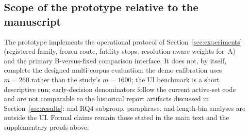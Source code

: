 \documentclass[pdflatex,sn-mathphys-num]{sn-jnl}
\begin{document}
\begin{appendices}
\subsection{Scope of the prototype relative to the manuscript}

The prototype implements the operational protocol of Section~\ref{sec:experiments} (registered family, frozen route, futility stops, resolution-aware weights for~A) and the primary B-versus-fixed comparison interface. It does not, by itself, complete the designed multi-corpus evaluation: the demo calibration uses \(m=260\) rather than the study's \(m=1600\); the UI benchmark is a short descriptive run; early-decision denominators follow the current active-set code and are not comparable to the historical report artifacts discussed in Section~\ref{sec:results}; and RQ4 subgroup, paraphrase, and length-bin analyses are outside the UI. Formal claims remain those stated in the main text and the supplementary proofs above.

\end{appendices}
\end{document}

